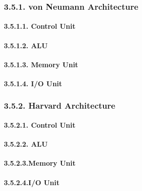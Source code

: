 \documentclass[
]{article}
\begin{document}
\hypertarget{von-neumann-architecture-1}{%
\subsubsection{3.5.1. von Neumann
Architecture}\label{von-neumann-architecture-1}}

\hypertarget{control-unit-2}{%
\paragraph{3.5.1.1. Control Unit}\label{control-unit-2}}

\hypertarget{alu-2}{%
\paragraph{3.5.1.2. ALU}\label{alu-2}}

\hypertarget{memory-unit-2}{%
\paragraph{3.5.1.3. Memory Unit}\label{memory-unit-2}}

\hypertarget{io-unit-2}{%
\paragraph{3.5.1.4. I/O Unit}\label{io-unit-2}}

\hypertarget{harvard-architecture-1}{%
\subsubsection{3.5.2. Harvard
Architecture}\label{harvard-architecture-1}}

\hypertarget{control-unit-3}{%
\paragraph{3.5.2.1. Control Unit}\label{control-unit-3}}

\hypertarget{alu-3}{%
\paragraph{3.5.2.2. ALU}\label{alu-3}}

\hypertarget{memory-unit-3}{%
\paragraph{3.5.2.3.Memory Unit}\label{memory-unit-3}}

\hypertarget{io-unit-3}{%
\paragraph{3.5.2.4.I/O Unit}\label{io-unit-3}}
\end{document}
